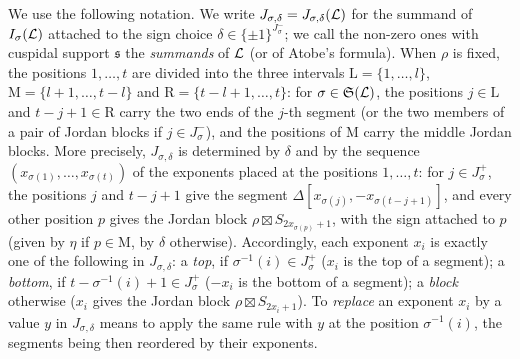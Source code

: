\documentclass[a4paper,12pt,leqno]{amsart}
\theoremstyle{plain}
\theoremstyle{definition}
\providecommand{\frS}{\mathfrak{S}}\providecommand{\frs}{\mathfrak{s}}
\begin{document}
We use the following notation. We write $J_{\sigma,\delta}=J_{\sigma,\delta}(\mathcal{L})$ for the summand of $I_\sigma(\mathcal{L})$ attached to the sign choice $\delta\in\{\pm1\}^{J^-_\sigma}$; we call the non-zero ones with cuspidal support $\frs$ the \emph{summands} of $\mathcal{L}$ (or of
Atobe's formula). When $\rho$ is fixed, the
positions $1,\ldots,t$ are divided into the three intervals $\mathrm L=\{1,\ldots,l\}$,
$\mathrm M=\{l+1,\ldots,t-l\}$ and $\mathrm R=\{t-l+1,\ldots,t\}$: for $\sigma\in\frS(\caL)$, the
positions $j\in\mathrm L$ and $t-j+1\in\mathrm R$ carry the two ends of the $j$-th segment (or the two
members of a pair of Jordan blocks if $j\in J^-_\sigma$), and the positions of $\mathrm M$ carry the
middle Jordan blocks. More precisely, $J_{\sigma,\delta}$ is determined by $\delta$ and by the sequence
$(x_{\sigma(1)},\ldots,x_{\sigma(t)})$ of the exponents placed at the positions $1,\ldots,t$: for $j\in
J^+_\sigma$, the positions $j$ and $t-j+1$ give the segment $\Delta[x_{\sigma(j)},-x_{\sigma(t-j+1)}]$, and every
other position $p$ gives the Jordan block $\rho\boxtimes S_{2x_{\sigma(p)}+1}$, with the sign attached to $p$
(given by $\eta$ if $p\in\mathrm M$, by $\delta$ otherwise). Accordingly, each exponent $x_i$ is exactly
one of the following in $J_{\sigma,\delta}$: a \emph{top}, if $\sigma^{-1}(i)\in J^+_\sigma$ ($x_i$ is the top
of a segment); a \emph{bottom}, if $t-\sigma^{-1}(i)+1\in J^+_\sigma$ ($-x_i$ is the bottom of a segment);
a \emph{block} otherwise ($x_i$ gives the Jordan block $\rho\boxtimes S_{2x_i+1}$). To \emph{replace} an
exponent $x_i$ by a value $y$ in $J_{\sigma,\delta}$ means to apply the same rule with $y$ at the position
$\sigma^{-1}(i)$, the segments being then reordered by their exponents.
\end{document}
